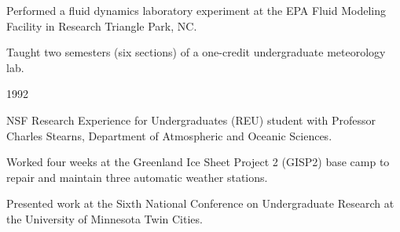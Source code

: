 \begin{compactitem}[\itembullet]
  \item Performed a fluid dynamics laboratory experiment at the EPA
    Fluid Modeling Facility in Research Triangle Park, NC.
\end{compactitem}

\begin{compactitem}[\itembullet]
  \item Taught two semesters (six sections) of a one-credit
    undergraduate meteorology lab.
\end{compactitem}

 {1992}
\begin{compactitem}[\itembullet]
  \item NSF Research Experience for Undergraduates (REU) student with
    Professor Charles Stearns, Department of Atmospheric and Oceanic
    Sciences.
  \item Worked four weeks at the Greenland Ice Sheet Project 2 (GISP2)
    base camp to repair and maintain three automatic weather stations.
  \item Presented work at the Sixth National Conference on
    Undergraduate Research at the University of Minnesota Twin Cities.
\end{compactitem}
